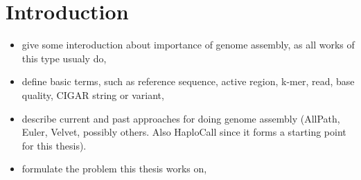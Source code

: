 \chapter{Introduction}
\label{chap:introduction}

\begin{itemize}
\item give some interoduction about importance of genome assembly, as all works of this type usualy do,
\item define basic terms, such as reference sequence, active region, k-mer, read, base quality, CIGAR string or variant,
\item describe current and past approaches for doing genome assembly (AllPath, Euler, Velvet, possibly others. Also HaploCall since it forms a starting point for this thesis). 
\item formulate the problem this thesis works on,
\end{itemize}
